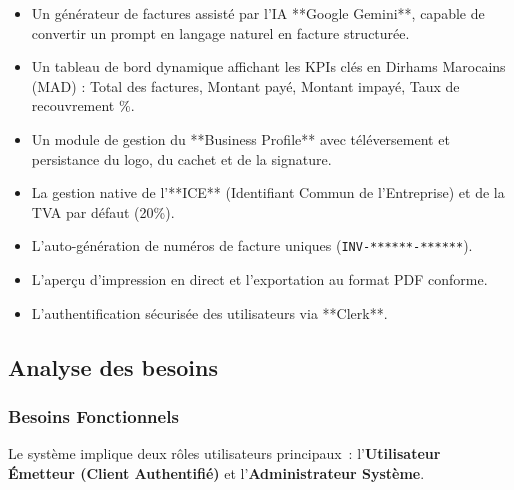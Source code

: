 \documentclass[a4paper,12pt]{extarticle}
\begin{document}
\begin{itemize}
  \item Un générateur de factures assisté par l'IA **Google Gemini**, capable de convertir un prompt en langage naturel en facture structurée.
  \item Un tableau de bord dynamique affichant les KPIs clés en Dirhams Marocains (MAD) : Total des factures, Montant payé, Montant impayé, Taux de recouvrement \%.
  \item Un module de gestion du **Business Profile** avec téléversement et persistance du logo, du cachet et de la signature.
  \item La gestion native de l'**ICE** (Identifiant Commun de l'Entreprise) et de la TVA par défaut (20\%).
  \item L'auto-génération de numéros de facture uniques (\texttt{INV-******-******}).
  \item L'aperçu d'impression en direct et l'exportation au format PDF conforme.
  \item L'authentification sécurisée des utilisateurs via **Clerk**.
\end{itemize}

\subsection{Analyse des besoins}

\subsubsection{Besoins Fonctionnels}

Le système implique deux rôles utilisateurs principaux~: l'\textbf{Utilisateur Émetteur (Client Authentifié)} et l'\textbf{Administrateur Système}.
\end{document}
